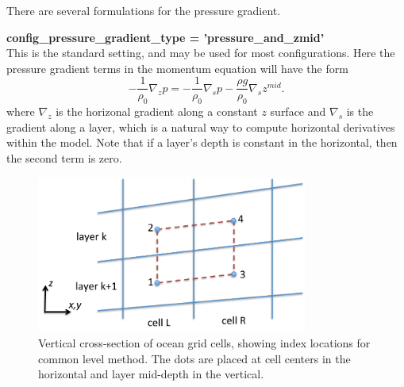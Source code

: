 There are several formulations for the pressure gradient.
 
{\bf \large config\_pressure\_gradient\_type = 'pressure\_and\_zmid'}\\
This is the standard setting, and may be used for most configurations.  Here the pressure gradient terms in the momentum equation will have the form
\begin{equation}
\label{ocean:\mode_grad p}
- \frac{1}{\rho_0}\nabla_z p = - \frac{1}{\rho_0}\nabla_s p - \frac{\rho g}{\rho_0}\nabla_s z^{mid}.
\end{equation}
where $\nabla_z$ is the horizonal gradient along a constant $z$ surface and $\nabla_s$ is the gradient along a layer, which is a natural way to compute horizontal derivatives within the model.  Note that if a layer's depth is constant in the horizontal, then the second term is zero.

\begin{figure}[htb]
\centering
\includegraphics[width=3.5in]{ocean/figures/common_level.pdf}
\caption{Vertical cross-section of ocean grid cells, showing index locations for common level method.  The dots are placed at cell centers in the horizontal and layer mid-depth in the vertical.}
\label{oceanFigure:\mode_common level}
\end{figure}

